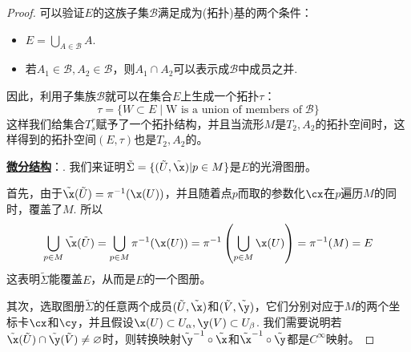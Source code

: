 \begin{proof}
	可以验证$E$的这族子集$\mathscr{B}$满足成为(拓扑)基的两个条件：
	\begin{itemize}
		\item $E=\bigcup\limits_{A\in \mathscr{B}}A$.
		\item 若$A_{1}\in \mathscr{B},A_{2}\in \mathscr{B}$，则$A_{1}\cap A_{2}$可以表示成$\mathscr{B}$中成员之并.
	\end{itemize}
	因此，利用子集族$\mathscr{B}$就可以在集合$E$上生成一个拓扑$\tau$：
	\[
	\tau=\{W\subset E\;|\;\text{W is a union of members of}\;\mathscr{B} \}
	\]
	这样我们给集合$T^{r}_{s}$赋予了一个拓扑结构，并且当流形$M$是$T_{2},A_{2}$的拓扑空间时，这样得到的拓扑空间$(E,\tau)$也是$T_{2},A_{2}$的。
	
	\textbf{\underline{微分结构}}：{}. 我们来证明$\tilde{  \Sigma  }=\{(\tilde{  U  },\tilde{  \x  }) | p\in M\}$是$E$的光滑图册。
	
	首先，由于$\tilde{  \x  }(\tilde{  U  })=\pi^{-1}(\x(U))$，并且随着点$p$而取的参数化$\cx$在$p$遍历$M$的同时，覆盖了$M$. 所以
	\[
	\bigcup\limits_{p\in M}\tilde{  \x  }(\tilde{  U  })
	=\bigcup\limits_{p\in M}\pi^{-1}(\x(U))=\pi^{-1}\left(\bigcup\limits_{p\in M}\x(U) \right)= \pi^{-1}(M)=E
	\]
	这表明$\tilde{  \Sigma  }$能覆盖$E$，从而是$E$的一个图册。
	
	其次，选取图册$\tilde{  \Sigma  }$的任意两个成员$(\tilde{  U  },\tilde{  \x  })$和$(\tilde{  V  },\tilde{  \y  }) $，它们分别对应于$M$的两个坐标卡$\cx$和$\cy$，并且假设$\x(U)\subset U_{\alpha},\y(V)\subset U_{\beta}$. 我们需要说明若$\tilde{  \x  }(\tilde{  U  })\cap\tilde{  \y  }(\tilde{  V  })\neq\varnothing$时，则转换映射$\tilde{  \y  }^{-1}\circ \tilde{  \x}$和$\tilde{  \x  }^{-1}\circ \tilde{  \y  }$都是$C^{\infty}$映射。
	

\end{proof}
